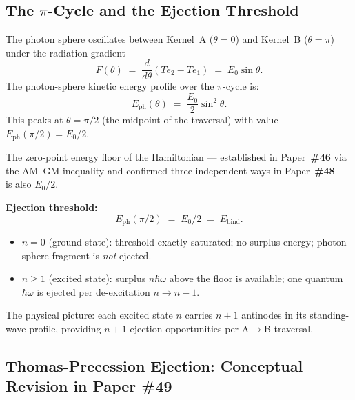 \documentclass[12pt,letterpaper]{article}
\newcommand{\paperno}[1]{\textbf{\#{}#1}}
\begin{document}
\subsection{\texorpdfstring{The $\pi$-Cycle and the Ejection Threshold}{The pi-Cycle and the Ejection Threshold}}
\label{subsec:pi_cycle}

The photon sphere oscillates between Kernel~A ($\theta = 0$) and Kernel~B
($\theta = \pi$) under the radiation gradient
\begin{equation}
F(\theta) \;=\; \frac{d}{d\theta}(Te_2 - Te_1) \;=\; E_0\sin\theta.
\label{eq:radiation_gradient}
\end{equation}
The photon-sphere kinetic energy profile over the $\pi$-cycle is:
\begin{equation}
E_{\mathrm{ph}}(\theta) \;=\; \frac{E_0}{2}\sin^2\theta.
\label{eq:eph_profile}
\end{equation}
This peaks at $\theta = \pi/2$ (the midpoint of the traversal) with value
$E_{\mathrm{ph}}(\pi/2) = E_0/2$.

The zero-point energy floor of the Hamiltonian --- established in Paper~\paperno{46}
via the AM--GM inequality and confirmed three independent ways in Paper~\paperno{48}
--- is also $E_0/2$.

\begin{mdframed}[style=bluebox]
\textbf{Ejection threshold:}
\begin{equation}
E_{\mathrm{ph}}(\pi/2) \;=\; E_0/2 \;=\; E_{\mathrm{bind}}.
\label{eq:threshold}
\end{equation}
\begin{itemize}[leftmargin=1.5em, itemsep=2pt]
  \item $n = 0$ (ground state): threshold exactly saturated; no surplus energy;
        photon-sphere fragment is \emph{not} ejected.
  \item $n \geq 1$ (excited state): surplus $n\hbar\omega$ above the floor is available;
        one quantum $\hbar\omega$ is ejected per de-excitation $n\to n-1$.
\end{itemize}
\end{mdframed}

\noindent The physical picture: each excited state $n$ carries $n+1$ antinodes in its
standing-wave profile, providing $n+1$ ejection opportunities per A$\to$B traversal.

\subsection{Thomas-Precession Ejection: Conceptual Revision in Paper \#49}
\label{subsec:tomonaga}
\end{document}
